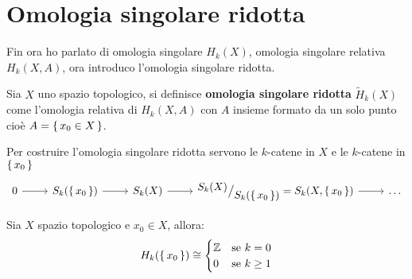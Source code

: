 \section{Omologia singolare ridotta}

Fin ora ho parlato di omologia singolare $ H_k(X) $, omologia singolare relativa
$ H_k(X,A) $, ora introduco l'omologia singolare ridotta.

\begin{definition}
  Sia $ X $ uno spazio topologico, si definisce \textbf{omologia singolare
    ridotta} $ \tilde{H}_k(X) $ come
  l'omologia relativa di $ H_k(X, A) $ con $ A $ insieme formato da un solo
  punto cioè $ A = \set{x_0 \in X} $.
\end{definition}
Per costruire l'omologia singolare ridotta servono le $ k $-catene in $ X $ e le
$ k $-catene in $ \set{x_0} $
\[
  \begin{tikzcd}
    0 \arrow{r}{} & S_k(\set{x_0}) \arrow{r}{} & S_k(X) \arrow{r}{} & \quot{S_k(X)}{S_k({\set{x_0}})} = S_k(X, \set{x_0}) \arrow{r}{} & \dots
  \end{tikzcd}
\]
\begin{lemma}
  Sia $ X $ spazio topologico e $ x_0 \in X $, allora:
  \[
    H_k(\set{x_0}) \cong
    \begin{cases}
      \mathbb{Z} & \text{se } k = 0 \\
      0 & \text{se } k \geq 1
    \end{cases}
  \]
\end{lemma}
